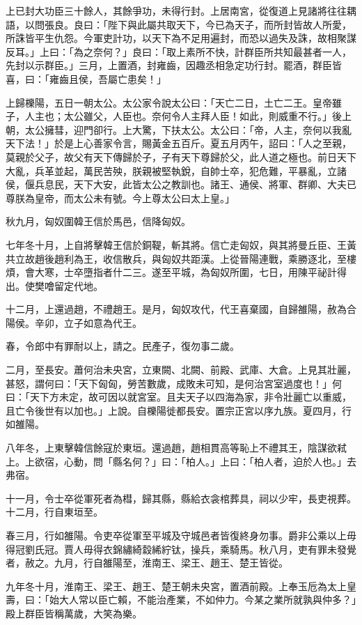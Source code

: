 \begin{pinyinscope}
上已封大功臣三十餘人，其餘爭功，未得行封。上居南宮，從復道上見諸將往往耦語，以問張良。良曰：「陛下與此屬共取天下，今已為天子，而所封皆故人所愛，所誅皆平生仇怨。今軍吏計功，以天下為不足用遍封，而恐以過失及誅，故相聚謀反耳。」上曰：「為之奈何？」良曰：「取上素所不快，計群臣所共知最甚者一人，先封以示群臣。」三月，上置酒，封雍齒，因趣丞相急定功行封。罷酒，群臣皆喜，曰：「雍齒且侯，吾屬亡患矣！」

上歸櫟陽，五日一朝太公。太公家令說太公曰：「天亡二日，土亡二王。皇帝雖子，人主也；太公雖父，人臣也。奈何令人主拜人臣！如此，則威重不行。」後上朝，太公擁彗，迎門卻行。上大驚，下扶太公。太公曰：「帝，人主，奈何以我亂天下法！」於是上心善家令言，賜黃金五百斤。夏五月丙午，詔曰：「人之至親，莫親於父子，故父有天下傳歸於子，子有天下尊歸於父，此人道之極也。前日天下大亂，兵革並起，萬民苦殃，朕親被堅執銳，自帥士卒，犯危難，平暴亂，立諸侯，偃兵息民，天下大安，此皆太公之教訓也。諸王、通侯、將軍、群卿、大夫已尊朕為皇帝，而太公未有號。今上尊太公曰太上皇。」

秋九月，匈奴圍韓王信於馬邑，信降匈奴。

七年冬十月，上自將擊韓王信於銅鞮，斬其將。信亡走匈奴，與其將曼丘臣、王黃共立故趙後趙利為王，收信散兵，與匈奴共距漢。上從晉陽連戰，乘勝逐北，至樓煩，會大寒，士卒墮指者什二三。遂至平城，為匈奴所圍，七日，用陳平祕計得出。使樊噲留定代地。

十二月，上還過趙，不禮趙王。是月，匈奴攻代，代王喜棄國，自歸雒陽，赦為合陽侯。辛卯，立子如意為代王。

春，令郎中有罪耐以上，請之。民產子，復勿事二歲。

二月，至長安。蕭何治未央宮，立東闕、北闕、前殿、武庫、大倉。上見其壯麗，甚怒，謂何曰：「天下匈匈，勞苦數歲，成敗未可知，是何治宮室過度也！」何曰：「天下方未定，故可因以就宮室。且夫天子以四海為家，非令壯麗亡以重威，且亡令後世有以加也。」上說。自櫟陽徙都長安。置宗正宮以序九族。夏四月，行如雒陽。

八年冬，上東擊韓信餘寇於東垣。還過趙，趙相貫高等恥上不禮其王，陰謀欲弒上。上欲宿，心動，問「縣名何？」曰：「柏人。」上曰：「柏人者，迫於人也。」去弗宿。

十一月，令士卒從軍死者為槥，歸其縣，縣給衣衾棺葬具，祠以少牢，長吏視葬。十二月，行自東垣至。

春三月，行如雒陽。令吏卒從軍至平城及守城邑者皆復終身勿事。爵非公乘以上毋得冠劉氏冠。賈人毋得衣錦繡綺縠絺紵钛，操兵，乘騎馬。秋八月，吏有罪未發覺者，赦之。九月，行自雒陽至，淮南王、梁王、趙王、楚王皆從。

九年冬十月，淮南王、梁王、趙王、楚王朝未央宮，置酒前殿。上奉玉卮為太上皇壽，曰：「始大人常以臣亡賴，不能治產業，不如仲力。今某之業所就孰與仲多？」殿上群臣皆稱萬歲，大笑為樂。


\end{pinyinscope}
